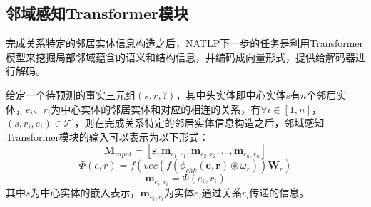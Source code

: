 \subsection{邻域感知Transformer模块}

完成关系特定的邻居实体信息构造之后，NATLP下一步的任务是利用Transformer模型来挖掘局部邻域蕴含的语义和结构信息，并编码成向量形式，提供给解码器进行解码。

给定一个待预测的事实三元组$(s,r,?)$，其中头实体即中心实体$s$有$n$个邻居实体，$e_i$、$r_i$为中心实体的邻居实体和对应的相连的关系，有$\forall  i\in\left[1,n\right] $，$(s,r_i,e_i) \in \mathcal{T}^\prime $，则在完成关系特定的邻居实体信息构造之后，邻域感知Transformer模块的输入可以表示为以下形式：
\begin{equation}
      \mathbf{M}_{input}=\left[\boldsymbol{s},\boldsymbol{m}_{e_1,r_1},\boldsymbol{m}_{e_2,r_2},...,\boldsymbol{m}_{e_n,r_n}\right]
\end{equation}
\begin{equation}
  \varPhi \left(e,r\right) = f\left(vec\left(f\left(\phi_{chk}\left(\boldsymbol{e},\boldsymbol{r}\right) \circledast \omega_{r} \right)\right)\mathbf{W}_{r}\right)
\end{equation}
\begin{equation}
    \boldsymbol{m}_{e_i,r_i}=\varPhi \left(e_i,r_i\right)
\end{equation}
其中$s$为中心实体的嵌入表示，$\boldsymbol{m}_{e_i,r_i}$为实体$e_i$通过关系$r_i$传递的信息。

